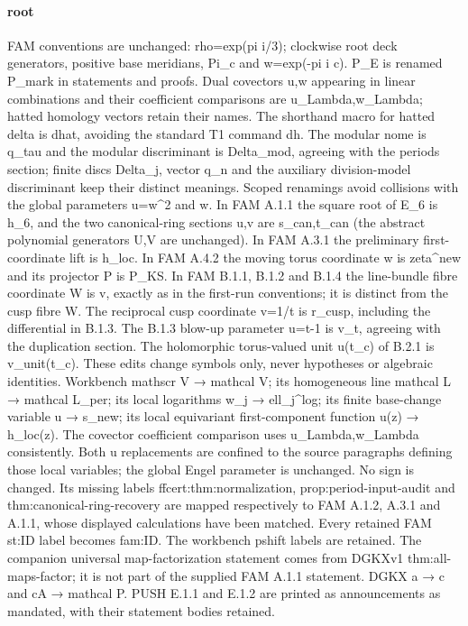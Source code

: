 \paragraph{root}
FAM conventions are unchanged:\allowbreak{} rho=exp(pi i/\allowbreak{}3); clockwise root deck generators, positive base meridians, Pi\_\allowbreak{}c and w=exp(-pi i c). P\_\allowbreak{}E is renamed P\_\allowbreak{}mark in statements and proofs. Dual covectors u,w appearing in linear combinations and their coefficient comparisons are u\_\allowbreak{}Lambda,w\_\allowbreak{}Lambda; hatted homology vectors retain their names. The shorthand macro for hatted delta is dhat, avoiding the standard T1 command dh. The modular nome is q\_\allowbreak{}tau and the modular discriminant is Delta\_\allowbreak{}mod, agreeing with the periods section; finite discs Delta\_\allowbreak{}j, vector q\_\allowbreak{}n and the auxiliary division-model discriminant keep their distinct meanings.
Scoped renamings avoid collisions with the global parameters u=w\textasciicircum{}2 and w. In FAM A.1.1 the square root of E\_\allowbreak{}6 is h\_\allowbreak{}6, and the two canonical-ring sections u,v are s\_\allowbreak{}can,t\_\allowbreak{}can (the abstract polynomial generators U,V are unchanged). In FAM A.3.1 the preliminary first-coordinate lift is h\_\allowbreak{}loc. In FAM A.4.2 the moving torus coordinate w is zeta\textasciicircum{}new and its projector P is P\_\allowbreak{}KS. In FAM B.1.1, B.1.2 and B.1.4 the line-bundle fibre coordinate W is v, exactly as in the first-run conventions; it is distinct from the cusp fibre W. The reciprocal cusp coordinate v=1/\allowbreak{}t is r\_\allowbreak{}cusp, including the differential in B.1.3. The B.1.3 blow-up parameter u=t-1 is v\_\allowbreak{}t, agreeing with the duplication section. The holomorphic torus-valued unit u(t\_\allowbreak{}c) of B.2.1 is v\_\allowbreak{}unit(t\_\allowbreak{}c). These edits change symbols only, never hypotheses or algebraic identities.
Workbench mathscr V → mathcal V; its homogeneous line mathcal L → mathcal L\_\allowbreak{}per; its local logarithms w\_\allowbreak{}j → ell\_\allowbreak{}j\textasciicircum{}log; its finite base-change variable u → s\_\allowbreak{}new; its local equivariant first-component function u(z) → h\_\allowbreak{}loc(z). The covector coefficient comparison uses u\_\allowbreak{}Lambda,w\_\allowbreak{}Lambda consistently. Both u replacements are confined to the source paragraphs defining those local variables; the global Engel parameter is unchanged. No sign is changed. Its missing labels ffcert:\allowbreak{}thm:\allowbreak{}normalization, prop:\allowbreak{}period-input-audit and thm:\allowbreak{}canonical-ring-recovery are mapped respectively to FAM A.1.2, A.3.1 and A.1.1, whose displayed calculations have been matched.
Every retained FAM st:\allowbreak{}ID label becomes fam:\allowbreak{}ID. The workbench pshift labels are retained. The companion universal map-factorization statement comes from DGKXv1 thm:\allowbreak{}all-maps-factor; it is not part of the supplied FAM A.1.1 statement. DGKX a → c and cA → mathcal P. PUSH E.1.1 and E.1.2 are printed as announcements as mandated, with their statement bodies retained.
